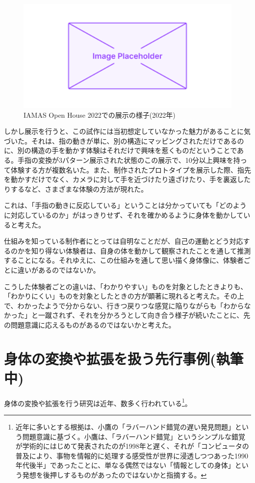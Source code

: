 \begin{figure}[H]
  \centering
  \includegraphics[width=15cm]{img/placeholder.png}
  \caption{IAMAS Open House 2022での展示の様子(2022年)}
  \label{fig:exhibit_2022}
\end{figure}

しかし展示を行うと、この試作には当初想定していなかった魅力があることに気づいた。それは、指の動きが単に、別の構造にマッピングされただけであるのに、別の構造の手を動かす体験はそれだけで興味を惹くものだということである。手指の変換が3パターン展示された状態のこの展示で、10分以上興味を持って体験する方が複数名いた。また、制作されたプロトタイプを展示した際、指先を動かすだけでなく、カメラに対して手を近づけたり遠ざけたり、手を裏返したりするなど、さまざまな体験の方法が現れた。

これは、「手指の動きに反応している」ということは分かっていても「どのように対応しているのか」がはっきりせず、それを確かめるように身体を動かしていると考えた。

仕組みを知っている制作者にとっては自明なことだが、自己の運動とどう対応するのかを知り得ない体験者は、自身の体を動かして観察されたことを通して推測することになる。それゆえに、この仕組みを通して思い描く身体像に、体験者ごとに違いがあるのではないか。

こうした体験者ごとの違いは、「わかりやすい」ものを対象としたときよりも、「わかりにくい」ものを対象としたときの方が顕著に現れると考えた。その上で、わかったようで分からない、行きつ戻りつな感覚に陥りながらも「わからなかった」と一蹴されず、それを分かろうとして向き合う様子が続いたことに、先の問題意識に応えるものがあるのではないかと考えた。

\section{身体の変換や拡張を扱う先行事例(執筆中)}
身体の変換や拡張を行う研究は近年、数多く行われている\footnote{近年に多いとする根拠は、小鷹の「ラバーハンド錯覚の遅い発見問題」という問題意識に基づく。小鷹は、「ラバーハンド錯覚」というシンプルな錯覚が学術的にはじめて発表されたのが1998年と遅く、それが「コンピュータの普及により、事物を情報的に処理する感受性が世界に浸透しつつあった1990年代後半」であったことに、単なる偶然ではない「情報としての身体」という発想を後押しするものがあったのではないかと指摘する\cite{kodaka}。}\cite{Kondo2020, ekusute,Kasahara2017,augmented_hand_series}。

